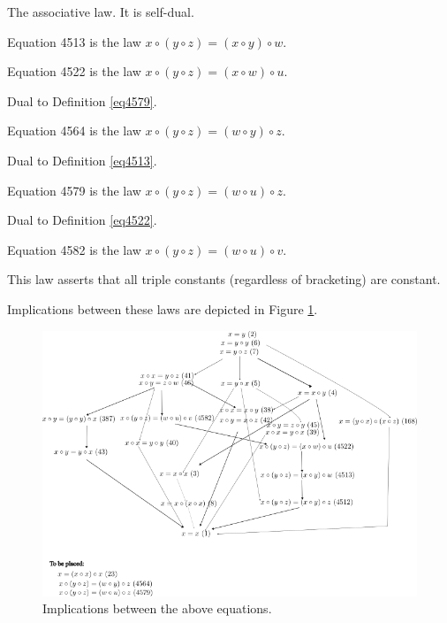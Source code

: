 The associative law. It is self-dual.

\begin{definition}[Equation 4513]\label{eq4513}\leanok{}  Equation 4513 is the law $x \circ (y \circ z) = (x \circ y) \circ w$.
\end{definition}

\begin{definition}[Equation 4522]\label{eq4522}\leanok{}  Equation 4522 is the law $x \circ (y \circ z) = (x \circ w) \circ u$.
\end{definition}

Dual to Definition \ref{eq4579}.

\begin{definition}[Equation 4564]\label{eq4564}\leanok{}  Equation 4564 is the law $x \circ (y \circ z) = (w \circ y) \circ z$.
\end{definition}

Dual to Definition \ref{eq4513}.

\begin{definition}[Equation 4579]\label{eq4579}\leanok{}  Equation 4579 is the law $x \circ (y \circ z) = (w \circ u) \circ z$.
\end{definition}

Dual to Definition \ref{eq4522}.

\begin{definition}[Equation 4582]\label{eq4582}\leanok{}  Equation 4582 is the law $x \circ (y \circ z) = (w \circ u) \circ v$.
\end{definition}

This law asserts that all triple constants (regardless of bracketing) are constant.

Implications between these laws are depicted in Figure \ref{fig:implications}.

\begin{figure}
  \centering
  \includegraphics[width=0.5\linewidth]{../../images/implications.png}
  \caption{Implications between the above equations.}
  \label{fig:implications}
\end{figure}
